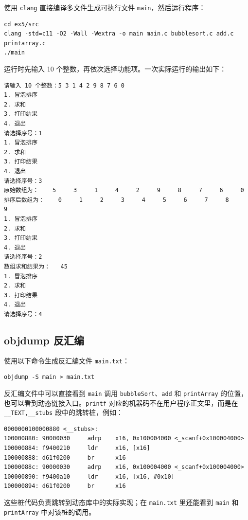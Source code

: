 \documentclass[12pt, a4paper]{academics}
\begin{document}
使用 \texttt{clang} 直接编译多文件生成可执行文件 \texttt{main}，然后运行程序：

\begin{verbatim}
cd ex5/src
clang -std=c11 -O2 -Wall -Wextra -o main main.c bubblesort.c add.c printarray.c
./main
\end{verbatim}

运行时先输入 10 个整数，再依次选择功能项。一次实际运行的输出如下：

\begin{verbatim}
请输入 10 个整数：5 3 1 4 2 9 8 7 6 0
1. 冒泡排序
2. 求和
3. 打印结果
4. 退出
请选择序号：1
1. 冒泡排序
2. 求和
3. 打印结果
4. 退出
请选择序号：3
原始数组为：    5     3     1     4     2     9     8     7     6     0
排序后数组为：    0     1     2     3     4     5     6     7     8     9
1. 冒泡排序
2. 求和
3. 打印结果
4. 退出
请选择序号：2
数组求和结果为：   45
1. 冒泡排序
2. 求和
3. 打印结果
4. 退出
请选择序号：4
\end{verbatim}

\subsection{objdump 反汇编}

使用以下命令生成反汇编文件 \texttt{main.txt}：

\begin{verbatim}
objdump -S main > main.txt
\end{verbatim}

反汇编文件中可以直接看到 \texttt{main} 调用 \texttt{bubbleSort}、\texttt{add} 和 \texttt{printArray} 的位置，也可以看到动态链接入口。\texttt{printf} 对应的机器码不在用户程序正文里，而是在 \texttt{__TEXT,__stubs} 段中的跳转桩，例如：

\begin{verbatim}
0000000100000880 <__stubs>:
100000880: 90000030     adrp    x16, 0x100004000 <_scanf+0x100004000>
100000884: f9400210     ldr     x16, [x16]
100000888: d61f0200     br      x16
10000088c: 90000030     adrp    x16, 0x100004000 <_scanf+0x100004000>
100000890: f9400a10     ldr     x16, [x16, #0x10]
100000894: d61f0200     br      x16
\end{verbatim}

这些桩代码负责跳转到动态库中的实际实现；在 \texttt{main.txt} 里还能看到 \texttt{main} 和 \texttt{printArray} 中对该桩的调用。
\end{document}
